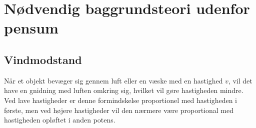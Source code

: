 \section{Nødvendig baggrundsteori udenfor pensum}
\subsection{Vindmodstand}\label{teori:vindmodstand}
Når et objekt bevæger sig gennem luft eller en væske med en hastighed $v$, vil det have en gnidning med luften omkring sig, hvilket vil gøre hastigheden mindre.
Ved lave hastigheder er denne formindskelse proportionel med hastigheden i første, men ved højere hastigheder vil den nærmere være proportional med hastigheden opløftet i anden potens. 

